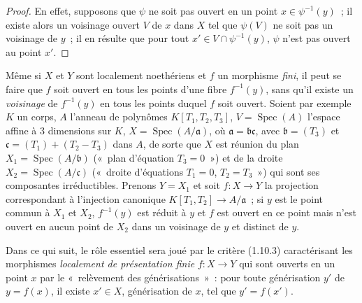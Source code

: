 \begin{proof}
En effet, supposons que $\psi$ ne soit pas ouvert en un point
$x\in\psi^{-1}(y)$~; il existe alors un voisinage ouvert $V$ de $x$ dans $X$ tel
que $\psi(V)$ ne soit pas un voisinage de $y$~; il en résulte que pour tout
$x'\in V\cap\psi^{-1}(y)$, $\psi$ n'est pas ouvert au point $x'$.
\end{proof}

\begin{remark}[14.1.5]
\label{IV.14.1.5-fr}
Même si $X$ et $Y$ sont localement noethériens et $f$ un morphisme \emph{fini},
il peut se faire que $f$ soit ouvert en tous les points d'une fibre $f^{-1}(y)$,
sans qu'il existe un \emph{voisinage} de $f^{-1}(y)$ en tous les points duquel $f$
soit ouvert. Soient par exemple $K$ un corps, $A$ l'anneau de polynômes
$K[T_1,T_2,T_3]$, $V=\operatorname{Spec}(A)$ l'espace affine à 3 dimensions sur
$K$, $X=\operatorname{Spec}(A/\mathfrak a)$, où $\mathfrak a=\mathfrak b\mathfrak c$,
avec $\mathfrak b=(T_3)$ et $\mathfrak c=(T_1)+(T_2-T_3)$ dans $A$, de sorte que
$X$ est réunion du plan $X_1=\operatorname{Spec}(A/\mathfrak b)$ («~plan
d'équation $T_3=0$~») et de la droite $X_2=\operatorname{Spec}(A/\mathfrak c)$
(«~droite d'équations $T_1=0$, $T_2=T_3$~») qui sont ses composantes
irréductibles. Prenons $Y=X_1$ et soit $f:X\to Y$ la projection correspondant à
l'injection canonique $K[T_1,T_2]\to A/\mathfrak a$~; si $y$ est le point commun
à $X_1$ et $X_2$, $f^{-1}(y)$ est réduit à $y$ et $f$ est ouvert en ce point mais
n'est ouvert en aucun point de $X_2$ dans un voisinage de $y$ et distinct de $y$.
\end{remark}

\begin{env}[14.1.6]
\label{IV.14.1.6-fr}
Dans ce qui suit, le rôle essentiel sera joué par le critère (1.10.3)
caractérisant les morphismes \emph{localement de présentation finie} $f:X\to Y$
qui sont ouverts en un point $x$ par le «~relèvement des générisations~»~: pour
toute générisation $y'$ de $y=f(x)$, il existe $x'\in X$, générisation de $x$, tel
que $y'=f(x')$.
\end{env}

